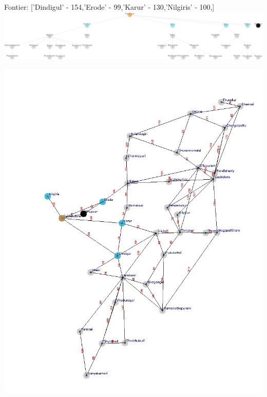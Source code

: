 \documentclass[xcolor=table]{beamer}
\begin{document}
\begin{frame}
  { \tiny Fontier: ['Dindigul' - 154,'Erode' - 99,'Karur' - 130,'Nilgiris' - 100,] }
  \includegraphics[width=1\textwidth]{../UCSNodes/5-1.png}
  \begin{center}
    \includegraphics[height=0.6\textheight]{../UCSoutput/tamilUCS3.jpg}
  \end{center}
\end{frame}
\end{document}
